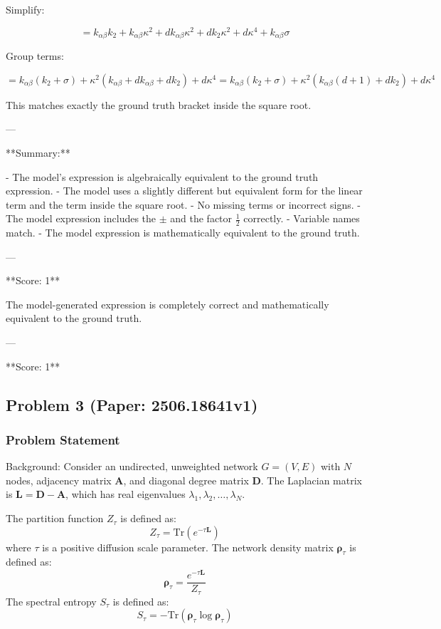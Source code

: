 \documentclass[10pt]{article}
\begin{document}
Simplify:

\[
= k_{\alpha\beta} k_2 + k_{\alpha\beta} \kappa^2 + d k_{\alpha\beta} \kappa^2 + d k_2 \kappa^2 + d \kappa^4 + k_{\alpha\beta} \sigma
\]

Group terms:

\[
= k_{\alpha\beta} (k_2 + \sigma) + \kappa^2 (k_{\alpha\beta} + d k_{\alpha\beta} + d k_2) + d \kappa^4
= k_{\alpha\beta} (k_2 + \sigma) + \kappa^2 (k_{\alpha\beta}(d+1) + d k_2) + d \kappa^4
\]

This matches exactly the ground truth bracket inside the square root.

---

**Summary:**

- The model's expression is algebraically equivalent to the ground truth expression.
- The model uses a slightly different but equivalent form for the linear term and the term inside the square root.
- No missing terms or incorrect signs.
- The model expression includes the \(\pm\) and the factor \(\frac{1}{2}\) correctly.
- Variable names match.
- The model expression is mathematically equivalent to the ground truth.

---

**Score: 1**

The model-generated expression is completely correct and mathematically equivalent to the ground truth.

---

**Score: 1**

\newpage
\subsection*{Problem 3 (Paper: 2506.18641v1)}
\subsubsection*{Problem Statement}
Background:
Consider an undirected, unweighted network $G=(V,E)$ with $N$ nodes, adjacency matrix $\mathbf{A}$, and diagonal degree matrix $\mathbf{D}$. The Laplacian matrix is $\mathbf{L = D - A}$, which has real eigenvalues $\lambda_1, \lambda_2, \dots, \lambda_N$.

The partition function $Z_{\tau}$ is defined as:
$$Z_{\tau} = \text{Tr}(e^{-\tau \mathbf{L}})$$
where $\tau$ is a positive diffusion scale parameter. The network density matrix $\pmb{\rho}_{τ}$ is defined as:
$$\pmb{\rho}_{τ} = \frac{e^{-\tau \mathbf{L}}}{Z_{\tau}}$$
The spectral entropy $S_{\tau}$ is defined as:
$$S_{\tau} = -\text{Tr}(\pmb{\rho}_{τ} \log \pmb{\rho}_{τ})$$
\end{document}
